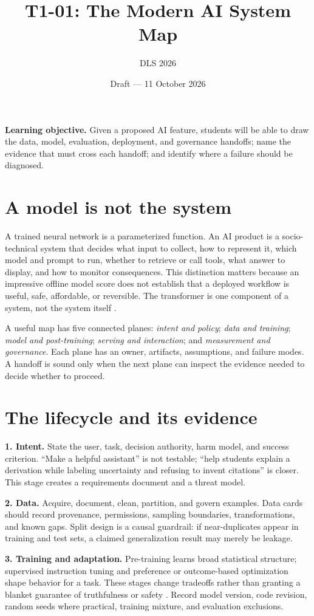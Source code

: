\documentclass[11pt]{article}
\title{T1-01: The Modern AI System Map}
\author{DLS 2026}\date{Draft --- 11 October 2026}
\begin{document}
\maketitle
\textbf{Learning objective.} Given a proposed AI feature, students will be able to draw the data, model, evaluation, deployment, and governance handoffs; name the evidence that must cross each handoff; and identify where a failure should be diagnosed.

\section{A model is not the system}
A trained neural network is a parameterized function. An AI product is a socio-technical system that decides what input to collect, how to represent it, which model and prompt to run, whether to retrieve or call tools, what answer to display, and how to monitor consequences. This distinction matters because an impressive offline model score does not establish that a deployed workflow is useful, safe, affordable, or reversible. The transformer is one component of a system, not the system itself \cite{vaswani2017,mlsysbook}.

A useful map has five connected planes: \emph{intent and policy}; \emph{data and training}; \emph{model and post-training}; \emph{serving and interaction}; and \emph{measurement and governance}. Each plane has an owner, artifacts, assumptions, and failure modes. A handoff is sound only when the next plane can inspect the evidence needed to decide whether to proceed.

\section{The lifecycle and its evidence}
\textbf{1. Intent.} State the user, task, decision authority, harm model, and success criterion. ``Make a helpful assistant'' is not testable; ``help students explain a derivation while labeling uncertainty and refusing to invent citations'' is closer. This stage creates a requirements document and a threat model.

\textbf{2. Data.} Acquire, document, clean, partition, and govern examples. Data cards should record provenance, permissions, sampling boundaries, transformations, and known gaps. Split design is a causal guardrail: if near-duplicates appear in training and test sets, a claimed generalization result may merely be leakage.

\textbf{3. Training and adaptation.} Pre-training learns broad statistical structure; supervised instruction tuning and preference or outcome-based optimization shape behavior for a task. These stages change tradeoffs rather than granting a blanket guarantee of truthfulness or safety \cite{ouyang2022}. Record model version, code revision, random seeds where practical, training mixture, and evaluation exclusions.
\end{document}
